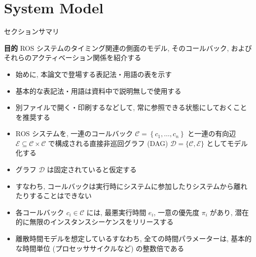 
\section{System Model}
\label{sec: system model}

\begin{frame}{セクションサマリ}
    \begin{itembox}[l]{\textbf{目的}}
        ROS システムのタイミング関連の側面のモデル, そのコールバック, およびそれらのアクティベーション関係を紹介する
    \end{itembox}
\end{frame}

\begin{frame}{}
    \begin{itemize}
        \item 始めに, 本論文で登場する表記法・用語の表を示す
        \item 基本的な表記法・用語は資料中で説明無しで使用する
        \item 別ファイルで開く・印刷するなどして, 常に参照できる状態にしておくことを推奨する
    \end{itemize}
\end{frame}



\begin{frame}{}
    \begin{itemize}
        \item ROS システムを, 一連のコールバック $\mathcal{C}=\left\{c_{1}, \ldots, c_{n}\right\}$ と一連の有向辺 $\mathcal{E} \subseteq \mathcal{C} \times \mathcal{C}$ で構成される直接非巡回グラフ (DAG) $\mathcal{D}=\{\mathcal{C}, \mathcal{E}\}$ としてモデル化する
\item グラフ $\mathcal{D}$ は固定されていると仮定する
\item すなわち, コールバックは実行時にシステムに参加したりシステムから離れたりすることはできない
    \end{itemize}
\end{frame}

\begin{frame}{}
    \begin{itemize}
        \item 各コールバック $c_{i} \in \mathcal{C}$ には, 最悪実行時間 $e_{i}$, 一意の優先度 $\pi_{i}$ があり, 潜在的に無限のインスタンスシーケンスをリリースする
\item 離散時間モデルを想定しているすなわち, 全ての時間パラメーターは, 基本的な時間単位 (プロセッササイクルなど) の整数倍である
    \end{itemize}
\end{frame}

